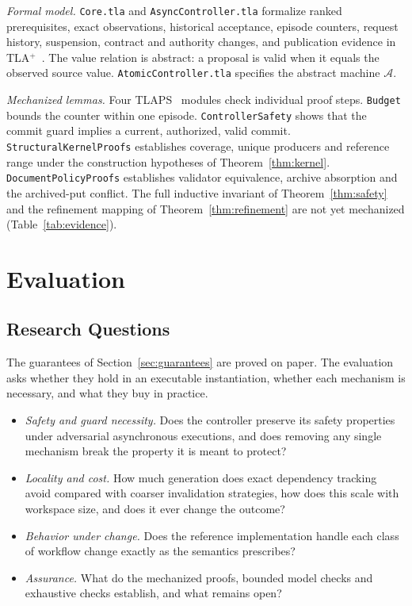 \documentclass[10pt,journal,compsoc]{IEEEtran}
\theoremstyle{plain}
\theoremstyle{definition}
\newcommand{\RQ}[1]{\textbf{RQ#1}}
\begin{document}
\emph{Formal model.} \texttt{Core.tla} and \texttt{AsyncController.tla} formalize ranked prerequisites, exact observations, historical acceptance, episode counters, request history, suspension, contract and authority changes, and publication evidence in TLA$^+$~\cite{lamport1994tla,lamport2002specifying}. The value relation is abstract: a proposal is valid when it equals the observed source value. \texttt{AtomicController.tla} specifies the abstract machine $\mathcal A$.

\emph{Mechanized lemmas.} Four TLAPS~\cite{cousineau2012tlaps} modules check individual proof steps. \texttt{Budget} bounds the counter within one episode. \texttt{ControllerSafety} shows that the commit guard implies a current, authorized, valid commit. \texttt{StructuralKernelProofs} establishes coverage, unique producers and reference range under the construction hypotheses of Theorem~\ref{thm:kernel}. \texttt{DocumentPolicyProofs} establishes validator equivalence, archive absorption and the archived-\textsf{put} conflict. The full inductive invariant of Theorem~\ref{thm:safety} and the refinement mapping of Theorem~\ref{thm:refinement} are not yet mechanized (Table~\ref{tab:evidence}).

\section{Evaluation}\label{sec:evaluation}

\subsection{Research Questions}
The guarantees of Section~\ref{sec:guarantees} are proved on paper. The evaluation asks whether they hold in an executable instantiation, whether each mechanism is necessary, and what they buy in practice.
\begin{itemize}
\item[\RQ{1}] \emph{Safety and guard necessity.} Does the controller preserve its safety properties under adversarial asynchronous executions, and does removing any single mechanism break the property it is meant to protect?
\item[\RQ{2}] \emph{Locality and cost.} How much generation does exact dependency tracking avoid compared with coarser invalidation strategies, how does this scale with workspace size, and does it ever change the outcome?
\item[\RQ{3}] \emph{Behavior under change.} Does the reference implementation handle each class of workflow change exactly as the semantics prescribes?
\item[\RQ{4}] \emph{Assurance.} What do the mechanized proofs, bounded model checks and exhaustive checks establish, and what remains open?
\end{itemize}
\end{document}
